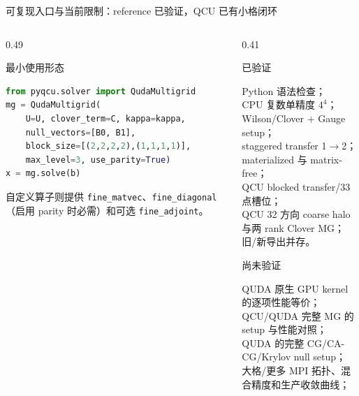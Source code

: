 \documentclass[UTF8,aspectratio=169,11pt]{ctexbeamer}
\begin{document}
\begin{frame}[t,fragile]{可复现入口与当前限制：reference 已验证，QCU 已有小格闭环}
  \footnotesize
  \begin{columns}[T,totalwidth=\textwidth]
    \begin{column}{0.49\textwidth}
      \begin{block}{最小使用形态}
        \begin{lstlisting}[language=Python,aboveskip=0.2em,belowskip=0.2em]
from pyqcu.solver import QudaMultigrid
mg = QudaMultigrid(
    U=U, clover_term=C, kappa=kappa,
    null_vectors=[B0, B1],
    block_size=[(2,2,2,2),(1,1,1,1)],
    max_level=3, use_parity=True)
x = mg.solve(b)
        \end{lstlisting}
        自定义算子则提供 \texttt{fine\_matvec}、\texttt{fine\_diagonal}（启用 parity 时必需）和可选 \texttt{fine\_adjoint}。
      \end{block}
    \end{column}
    \begin{column}{0.41\textwidth}
      \begin{block}{已验证}
        \scriptsize
        \begin{minipage}{0.97\linewidth}
          Python 语法检查；\\[-0.1em]
          CPU 复数单精度 $4^4$；\\[-0.1em]
          Wilson/Clover + Gauge setup；\\[-0.1em]
          staggered transfer 1$\to$2；\\[-0.1em]
          materialized 与 matrix-free；\\[-0.1em]
          QCU blocked transfer/33 点槽位；\\[-0.1em]
          QCU 32 方向 coarse halo 与两 rank Clover MG；\\[-0.1em]
          旧/新导出并存。
        \end{minipage}
      \end{block}
      \begin{alertblock}{尚未验证}
        \scriptsize
        \begin{minipage}{0.97\linewidth}
          QUDA 原生 GPU kernel 的逐项性能等价；\\[-0.1em]
          QCU/QUDA 完整 MG 的 setup 与性能对照；\\[-0.1em]
          QUDA 的完整 CG/CA-CG/Krylov null setup；\\[-0.1em]
          大格/更多 MPI 拓扑、混合精度和生产收敛曲线；\\[-0.1em]

\end{minipage}
\end{alertblock}
\end{column}
\end{columns}
\end{frame}
\end{document}
